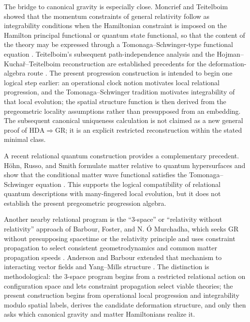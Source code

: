 \documentclass[11pt]{article}
\begin{document}
The bridge to canonical gravity is especially close. Moncrief and Teitelboim showed that the momentum constraints of general relativity follow as integrability conditions when the Hamiltonian constraint is imposed on the Hamilton principal functional or quantum state functional, so that the content of the theory may be expressed through a Tomonaga--Schwinger-type functional equation \cite{MoncriefTeitelboim1972}. Teitelboim's subsequent path-independence analysis and the Hojman--Kucha\v{r}--Teitelboim reconstruction are established precedents for the deformation-algebra route \cite{Teitelboim1973,HKT1976}. The present progression construction is intended to begin one logical step earlier: an operational clock notion motivates local relational progression, and the Tomonaga--Schwinger tradition motivates integrability of that local evolution; the spatial structure function is then derived from the pregeometric locality assumptions rather than presupposed from an embedding. The subsequent canonical uniqueness calculation is not claimed as a new general proof of $\mathrm{HDA}\Rightarrow\mathrm{GR}$; it is an explicit restricted reconstruction within the stated minimal class.

A recent relational quantum construction provides a complementary precedent. H\"ohn, Russo, and Smith formulate matter relative to quantum hypersurfaces and show that the conditional matter wave functional satisfies the Tomonaga--Schwinger equation \cite{Hoehn2024}. This supports the logical compatibility of relational quantum descriptions with many-fingered local evolution, but it does not establish the present pregeometric progression algebra.

Another nearby relational program is the ``3-space'' or ``relativity without relativity'' approach of Barbour, Foster, and N. {\'O} Murchadha, which seeks GR without presupposing spacetime or the relativity principle and uses constraint propagation to select consistent geometrodynamics and common matter propagation speeds \cite{Barbour2002}. Anderson and Barbour extended that mechanism to interacting vector fields and Yang--Mills structure \cite{AndersonBarbour2002}. The distinction is methodological: the 3-space program begins from a restricted relational action on configuration space and lets constraint propagation select viable theories; the present construction begins from operational local progression and integrability modulo spatial labels, derives the candidate deformation structure, and only then asks which canonical gravity and matter Hamiltonians realize it.
\end{document}
